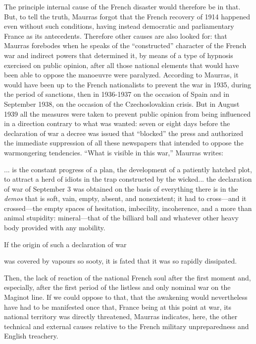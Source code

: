 The principle internal cause of the French disaster would therefore be in that. But, to tell the truth, Maurras forgot that the French recovery of 1914 happened even without such conditions, having instead democratic and parliamentary France as its antecedents. Therefore other causes are also looked for: that Maurras forebodes when he speaks of the ``constructed'' character of the French war and indirect powers that determined it, by means of a type of hypnosis exercised on public opinion, after all those national elements that would have been able to oppose the manoeuvre were paralyzed. According to Maurras, it would have been up to the French nationalists to prevent the war in 1935, during the period of sanctions, then in 1936-1937 on the occasion of Spain and in September 1938, on the occasion of the Czechoslovakian crisis. But in August 1939 all the measures were taken to prevent public opinion from being influenced in a direction contrary to what was wanted: seven or eight days before the declaration of war a decree was issued that ``blocked'' the press and authorized the immediate suppression of all these newspapers that intended to oppose the warmongering tendencies. ``What is visible in this war,'' Maurras writes:

\begin{quotex}
... is the constant progress of a plan, the development of a patiently hatched plot, to attract a herd of idiots in the trap constructed by the wicked... the declaration of war of September 3 was obtained on the basis of everything there is in the \emph{demos} that is soft, vain, empty, absent, and nonexistent; it had to cross---and it crossed---the empty spaces of hesitation, imbecility, incoherence, and a more than animal stupidity: mineral---that of the billiard ball and whatever other heavy body provided with any mobility.
\end{quotex}


If the origin of such a declaration of war

\begin{quotex}
was covered by vapours so sooty, it is fated that it was so rapidly dissipated.
\end{quotex}


Then, the lack of reaction of the national French soul after the first moment and, especially, after the first period of the listless and only nominal war on the Maginot line. If we could oppose to that, that the awakening would nevertheless have had to be manifested once that, France being at this point at war, its national territory was directly threatened, Maurras indicates, here, the other technical and external causes relative to the French military unpreparedness and English treachery.


